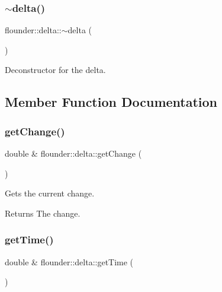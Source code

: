 \mbox{\label{classflounder_1_1delta_af9eb174b15b3730a45a903e988dac1e8}} 
\subsubsection{\texorpdfstring{$\sim$delta()}{~delta()}}
{\footnotesize\ttfamily flounder\+::delta\+::$\sim$delta (\begin{DoxyParamCaption}{ }\end{DoxyParamCaption})}



Deconstructor for the delta. 



\subsection{Member Function Documentation}
\mbox{\label{classflounder_1_1delta_a59d00ad5b5752e6e69f35d7a294c2788}} 
\subsubsection{\texorpdfstring{get\+Change()}{getChange()}}
{\footnotesize\ttfamily double \& flounder\+::delta\+::get\+Change (\begin{DoxyParamCaption}{ }\end{DoxyParamCaption})}



Gets the current change. 

\begin{DoxyReturn}{Returns}
The change. 
\end{DoxyReturn}
\mbox{\label{classflounder_1_1delta_a86e834ff826cd867bb64099f94195f05}} 
\subsubsection{\texorpdfstring{get\+Time()}{getTime()}}
{\footnotesize\ttfamily double \& flounder\+::delta\+::get\+Time (\begin{DoxyParamCaption}{ }\end{DoxyParamCaption})}



